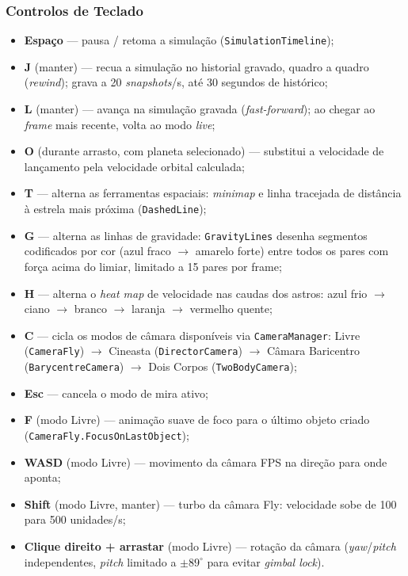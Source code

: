 \documentclass[12pt,a4paper]{article}
\begin{document}
\subsubsection{Controlos de Teclado}

\begin{itemize}
  \item \textbf{Espa\c{c}o} --- pausa / retoma a simula\c{c}\~{a}o (\texttt{SimulationTimeline});
  \item \textbf{J} (manter) --- recua a simula\c{c}\~{a}o no historial gravado, quadro a quadro (\textit{rewind}); grava a 20 \textit{snapshots}/s, at\'{e} 30 segundos de hist\'{o}rico;
  \item \textbf{L} (manter) --- avan\c{c}a na simula\c{c}\~{a}o gravada (\textit{fast-forward}); ao chegar ao \textit{frame} mais recente, volta ao modo \textit{live};
  \item \textbf{O} (durante arrasto, com planeta selecionado) --- substitui a velocidade de lan\c{c}amento pela velocidade orbital calculada;
  \item \textbf{T} --- alterna as ferramentas espaciais: \textit{minimap} e linha tracejada de dist\^{a}ncia \`{a} estrela mais pr\'{o}xima (\texttt{DashedLine});
  \item \textbf{G} --- alterna as linhas de gravidade: \texttt{GravityLines} desenha segmentos codificados por cor (azul fraco $\to$ amarelo forte) entre todos os pares com for\c{c}a acima do limiar, limitado a 15 pares por frame;
  \item \textbf{H} --- alterna o \textit{heat map} de velocidade nas caudas dos astros: azul frio $\to$ ciano $\to$ branco $\to$ laranja $\to$ vermelho quente;
  \item \textbf{C} --- cicla os modos de c\^{a}mara dispon\'{i}veis via \texttt{CameraManager}: Livre (\texttt{CameraFly}) $\to$ Cineasta (\texttt{DirectorCamera}) $\to$ C\^amara Baricentro (\texttt{BarycentreCamera}) $\to$ Dois Corpos (\texttt{TwoBodyCamera});
  \item \textbf{Esc} --- cancela o modo de mira ativo;
  \item \textbf{F} (modo Livre) --- anima\c{c}\~{a}o suave de foco para o \'{u}ltimo objeto criado (\texttt{CameraFly.}\allowbreak\texttt{FocusOnLastObject});
  \item \textbf{WASD} (modo Livre) --- movimento da c\^{a}mara FPS na dire\c{c}\~{a}o para onde aponta;
  \item \textbf{Shift} (modo Livre, manter) --- turbo da c\^{a}mara Fly: velocidade sobe de 100 para 500 unidades/s;
  \item \textbf{Clique direito + arrastar} (modo Livre) --- rota\c{c}\~{a}o da c\^{a}mara (\textit{yaw}/\textit{pitch} independentes, \textit{pitch} limitado a $\pm89^{\circ}$ para evitar \textit{gimbal lock}).
\end{itemize}
\end{document}
